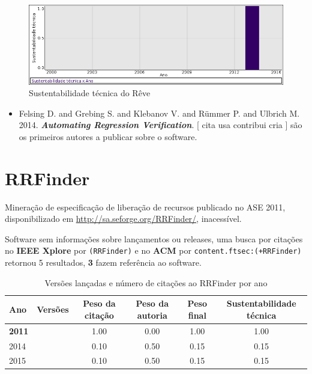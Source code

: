\begin{figure}[h]
  \center
  \includegraphics[scale=0.50]{result-documents/charts/reve.png}
  \caption{Sustentabilidade técnica do Rêve}
\end{figure}


\begin{itemize}
\item Felsing D. and Grebing S. and Klebanov V. and R\"{u}mmer P. and Ulbrich M.
      2014.
        \textbf{\textit{ Automating Regression Verification}}.
      [
          cita
          usa
          contribui
          cria
      ]
são os primeiros autores a publicar sobre o software.
\end{itemize}
\section{RRFinder}

Mineração de especificação de liberação de recursos
publicado no ASE 2011,
disponibilizado em \url{http://sa.seforge.org/RRFinder/},
inacessível.

Software sem informações sobre lançamentos ou releases,
uma busca por citações no {\bf IEEE Xplore} por
\texttt{(RRFinder)}
e no {\bf ACM} por
\texttt{content.ftsec:(+RRFinder)}
retornou
5 resultados,
{\bf 3} fazem referência ao software.


\begin{table}[H]
\caption{Versões lançadas e número de citações ao RRFinder por ano}
\centering
\begin{tabular}{| l | c | c | c | c | c |}
  \hline
  Ano & Versões & Peso da citação & Peso da autoria & Peso final & Sustentabilidade técnica \\
  \hline
            {\bf 2011}
          &
          
          &
          1.00
          &
          0.00
          &
          1.00
          &
            {\color{blue} 1.00}
          \\
\hline
            2014
          &
          
          &
          0.10
          &
          0.50
          &
          0.15
          &
            {\color{red} 0.15}
          \\
\hline
            2015
          &
          
          &
          0.10
          &
          0.50
          &
          0.15
          &
            {\color{red} 0.15}
          \\
\hline
\end{tabular}
\end{table}

